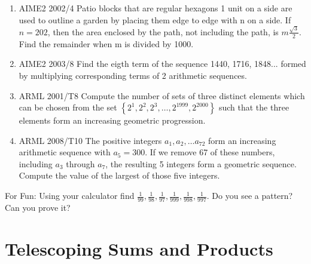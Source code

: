 \documentclass{article}
\begin{document}
\begin{enumerate}
\item AIME2 2002/4 Patio blocks that are regular hexagons 1 unit on a side are used to outline a garden by placing them edge to edge with n on a side. If $n=202$, then the area enclosed by the path, not including the path, is $m \frac{\sqrt{3}}{2}$. Find the remainder when m is divided by 1000.
\item AIME2 2003/8 Find the eigth term of the sequence 1440, 1716, 1848... formed by multiplying corresponding terms of 2 arithmetic sequences.
\item ARML 2001/T8 Compute the number of sets of three distinct elements which can be chosen from the set $\left\{2^1, 2^2, 2^3, \ldots, 2^{1999}, 2^{2000}\right\}$ such that the three elements form an increasing geometric progression.
\item ARML 2008/T10 The positive integers $a_1, a_2, \ldots a_{72}$ form an increasing arithmetic sequence with $a_5 = 300$. If we remove 67 of these numbers, including $a_3$ through $a_7$, the resulting 5 integers form a geometric sequence. Compute the value of the largest of those five integers.
\end{enumerate}
For Fun: Using your calculator find $\frac{1}{99}, \frac{1}{98}, \frac{1}{97}, \frac{1}{999}, \frac{1}{998}, \frac{1}{997}$. Do you see a pattern? Can you prove it?

\section{Telescoping Sums and Products}
\end{document}
